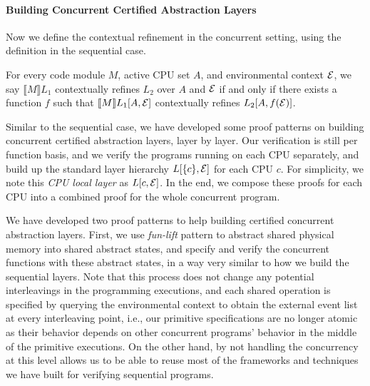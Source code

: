
\paragraph{Building Concurrent Certified Abstraction Layers}
Now we define the contextual refinement in the concurrent setting,
using the definition in the sequential case.

\begin{definition}
For every code module $M$, active CPU set $A$, and environmental context
$\mathcal{E}$, we say $\llbracket{}M\rrbracket{}L_1$ contextually refines
$L_2$ over $A$ and $\mathcal{E}$ if and only if there exists a function
$f$ such that $\llbracket{}M\rrbracket{}L_1[A,\mathcal{E}]$ contextually
refines $L_2[A,f(\mathcal{E})]$. 
\end{definition}

Similar to the sequential case, we have developed some proof patterns on
building concurrent certified abstraction layers, layer by layer.
Our verification is still per function basis, and we verify the programs
running on each CPU separately, and build up the standard layer hierarchy
$L[\{c\},\mathcal{E}]$ for each CPU $c$. For simplicity, we note this
\emph{CPU local layer} as $L[c,\mathcal{E}]$.
In the end, we compose these proofs for each CPU
into a combined proof for the whole concurrent program.

We have developed two proof patterns to help building certified concurrent
abstraction layers. First, we use \emph{fun-lift} pattern to abstract shared
physical memory into shared abstract states, and specify and verify the
concurrent functions with these abstract states, in a way very similar to
how we build the sequential layers. Note that this process does not change
any potential interleavings in the programming executions, and each shared
operation is specified by querying the environmental context to obtain the
external event list at every interleaving point, i.e., our primitive specifications
are no longer atomic as their behavior depends on other concurrent programs' behavior
in the middle of the primitive executions. On the other hand, by not handling
the concurrency at this level allows us to be able to reuse most of the
frameworks and techniques we have built for verifying sequential programs.

